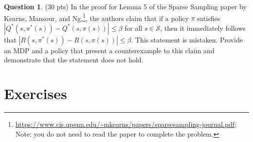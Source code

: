 \documentclass{article}
\theoremstyle{definition}
\newtheorem{question}[thm]{Question}
\begin{document}

\begin{question}
    (30 pts) In the proof for Lemma 5 of the Sparse Sampling paper by Kearns, Mansour, and Ng,\footnote{\url{https://www.cis.upenn.edu/~mkearns/papers/sparsesampling-journal.pdf}; Note: you do not need to read the paper to complete the problem.}, the authors claim that if a policy $\pi$ satisfies $|Q^*(s, \pi^*(s)) - Q^*(s, \pi(s))| \leq \beta$ for all $s \in \mathcal{S}$, then it immediately follows that $|R(s, \pi^*(s)) - R(s, \pi(s))| \leq \beta$. This statement is mistaken. Provide an MDP and a policy that present a counterexample to this claim and demonstrate that the statement does not hold.
\end{question}

\section{Exercises}
\end{document}
